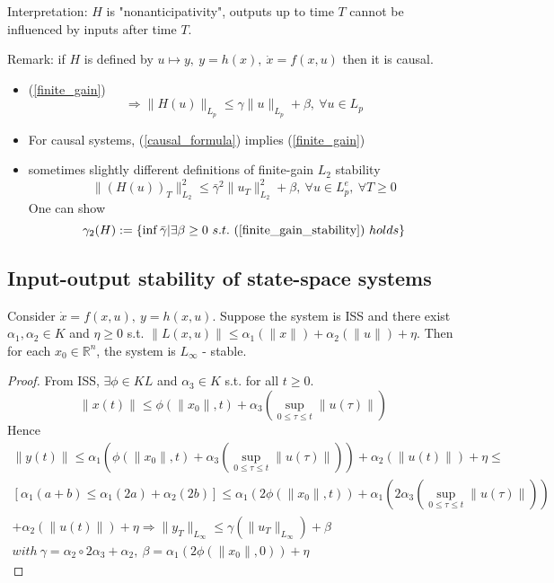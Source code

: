 Interpretation: $H$ is "nonanticipativity", outputs up to time $T$ cannot be influenced by inputs after time $T$.

Remark: if $H$ is defined by $u \mapsto y, \ y = h(x), \ \dot{x} = f(x,u)$ then it is causal.
\begin{itemize}
\item (\ref{finite_gain})
\begin{equation}\label{causal_formula}
\Rightarrow \|H(u)\|_{L_p} \leq \gamma \|u\|_{L_p} + \beta, \ \forall u \in L_p
\end{equation}
\item For causal systems, (\ref{causal_formula}) implies (\ref{finite_gain})
\item sometimes slightly different definitions of finite-gain $L_2$ stability
\begin{equation}\label{finite_gain_stability}
\|(H(u))_T\|^2_{L_2} \leq \bar{\gamma}^2 \|u_T\|^2_{L_2} + \beta, \ \forall u \in L_p^e, \ \forall T \geq 0
\end{equation}
One can show 
\begin{equation*}
\gamma_2(H) := \{ \inf \bar{\gamma} | \exists \beta \geq 0 \ s.t. \ (\ref{finite_gain_stability})\ holds \}
\end{equation*}
\end{itemize}

\subsection{Input-output stability of state-space systems}

\begin{Theorem}
Consider $\dot{x} = f(x,u), \ y = h(x,u)$. Suppose the system is ISS and there exist $\alpha_1, \alpha_2 \in K$ and $\eta \geq 0$ s.t. $\|L(x,u)\| \leq \alpha_1(\|x\|) + \alpha_2(\|u\|) + \eta$. Then for each $x_0 \in \mathbb{R}^n$, the system is $L_{\infty}$ - stable.
\begin{proof}
From ISS, $\exists \phi \in KL$ and $\alpha_3 \in K$ s.t. for all $t \geq 0$.
\begin{equation*}
\|x(t)\| \leq \phi(\|x_0\|, t) + \alpha_3(\sup_{0\leq \tau \leq t}\|u(\tau)\|)
\end{equation*}
Hence 
\begin{equation*}
\begin{split}
\|y(t)\| \leq \alpha_1(\phi (\|x_0\|, t) + \alpha_3(\sup_{ 0 \leq \tau 
\leq t}\|u(\tau)\|)) + \alpha_2(\|u(t)\|) + \eta \leq \\ 
[\alpha_1(a+b) \leq \alpha_1(2a)+\alpha_2(2b)] \leq \alpha_1(2\phi(\|x_0\|,t)) + \alpha_1(2 \alpha_3(\sup_{0 \leq \tau \leq t}\|u(\tau)\|))\\
+ \alpha_2(\|u(t)\|)+\eta \Rightarrow \|y_T\|_{L_{\infty}} \leq \gamma(\|u_T\|_{L_{\infty}}) + \beta \\
with\ \gamma = \alpha_2 \circ 2\alpha_3 + \alpha_2, \ \beta = \alpha_1(2\phi(\|x_0\|,0)) + \eta
\end{split}
\end{equation*}
\end{proof}
\end{Theorem}

